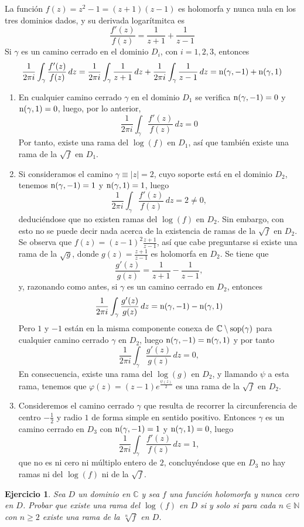 \documentclass[11pt]{report}
\makeatletter
\renewenvironment{proof}[1][\proofname]{\par
  \pushQED{\qed}%
  \normalfont \topsep\z@skip %
  \trivlist
  \item[\hskip\labelsep
        \itshape
    #1\@addpunct{.}]\ignorespaces
}{%
  \popQED\endtrivlist\@endpefalse
}
\newcommand{\N}{\mathbb N}
\newcommand{\C}{\mathbb C}
\newtheorem{ejercicio}{Ejercicio}
\makeatother
\begin{document}
\begin{proof}
La función $f(z) = z^2-1 = (z+1)(z-1)$ es holomorfa y nunca nula en los tres dominios dados, y su derivada logarítmitca es
\[\frac{f'(z)}{f(z)} = \frac{1}{z+1}+\frac{1}{z-1}\]
Si $\gamma$ es un camino cerrado en el dominio $D_i$, con $i = 1,2,3$, entonces
\[\frac{1}{2\pi i}\int_{\gamma}\frac{f'(z)}{f(z)} \, dz = \frac{1}{2\pi i}\int_{\gamma} \frac{1}{z+1} \, dz +\frac{1}{2\pi i}\int_{\gamma} \frac{1}{z-1} \, dz = \textup{n}(\gamma,-1)+\textup{n}(\gamma,1)\]
  \begin{enumerate}
    \item En cualquier camino cerrado $\gamma$ en el dominio $D_1$ se verifica $\textup{n}(\gamma,-1) = 0$ y $\textup{n}(\gamma,1) = 0$, luego, por lo anterior,
    \[\frac{1}{2\pi i}\int_{\gamma}\frac{f'(z)}{f(z)} \, dz = 0\]
    Por tanto, existe una rama del $\log(f)$ en $D_1$, así que también existe una rama de la $\sqrt{f}$ en $D_1$.
    \item Si consideramos el camino $\gamma \equiv |z| = 2$, cuyo soporte está en el dominio $D_2$, tenemos $\textup{n}(\gamma,-1) = 1$ y $\textup{n}(\gamma,1) = 1$, luego
    \[\frac{1}{2\pi i }\int_{\gamma} \frac{f'(z)}{f(z)} \, dz =2 \neq 0,\]
    deduciéndose que no existen ramas del $\log(f)$ en $D_2$. Sin embargo, con esto no se puede decir nada acerca de la existencia de ramas de la $\sqrt{f}$ en $D_2$. Se observa que $f(z) = (z-1)^2\frac{z+1}{z-1}$, así que cabe preguntarse si existe una rama de la $\sqrt{g}$, donde $g(z) = \frac{z+1}{z-1}$ es holomorfa en $D_2$. Se tiene que
    \[\frac{g'(z)}{g(z)} = \frac{1}{z+1}-\frac{1}{z-1},\]
    y, razonando como antes, si $\gamma$ es un camino cerrado en $D_2$, entonces
    \[\frac{1}{2\pi i}\int_{\gamma}\frac{g'(z)}{g(z)} \, dz = \textup{n}(\gamma,-1)-\textup{n}(\gamma,1)\]
    Pero $1$ y $-1$ están en la misma componente conexa de $\C \setminus \textup{sop}(\gamma)$ para cualquier camino cerrado $\gamma$ en $D_2$, luego $ \textup{n}(\gamma,-1)=\textup{n}(\gamma,1)$ y por tanto
    \[\frac{1}{2\pi i}\int_{\gamma}\frac{g'(z)}{g(z)} \, dz = 0,\]
    En consecuencia, existe una rama del $\log(g)$ en $D_2$, y llamando $\psi$ a esta rama, tenemos que $\varphi(z) = (z-1)e^{\frac{\psi(z)}{2}}$ es una rama de la $\sqrt{f}$ en $D_2$.
    \item Consideremos el camino cerrado $\gamma$ que resulta de recorrer la circunferencia de centro $-\frac{1}{2}$ y radio $1$ de forma simple en sentido positivo. Entonces $\gamma$ es un camino cerrado en $D_3$ con $\textup{n}(\gamma,-1) = 1$ y $\textup{n}(\gamma,1) = 0$, luego
    \[\frac{1}{2\pi i}\int_{\gamma}\frac{f'(z)}{f(z)} \, dz = 1,\]
    que no es ni cero ni múltiplo entero de $2$, concluyéndose que en $D_3$ no hay ramas ni del $\log(f)$ ni de la $\sqrt{f}$. \qedhere
   \end{enumerate}
\end{proof}
\begin{ejercicio}
  Sea $D$ un dominio en $\C$ y sea $f$ una función holomorfa y nunca cero en $D$. Probar que existe una rama del $\log(f)$ en $D$ si y solo si para cada $n \in \N$ con $n\geq 2$ existe una rama de la $\sqrt[n]{f}$ en $D$.
\end{ejercicio}
\end{document}
